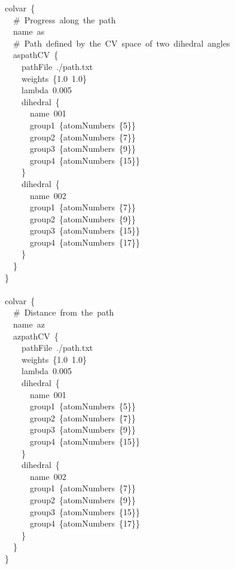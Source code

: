\begin{cvexampleinput}
colvar~\{\\
\-~~\#~Progress~along~the~path\\
\-~~name~as\\
\-~~\#~Path~defined~by~the~CV~space~of~two~dihedral~angles\\
\-~~aspathCV~\{\\
\-~~~~pathFile~./path.txt\\
\-~~~~weights~\{1.0~1.0\}\\
\-~~~~lambda~0.005\\
\-~~~~dihedral~\{\\
\-~~~~~~name~001\\
\-~~~~~~group1~\{atomNumbers~\{5\}\}\\
\-~~~~~~group2~\{atomNumbers~\{7\}\}\\
\-~~~~~~group3~\{atomNumbers~\{9\}\}\\
\-~~~~~~group4~\{atomNumbers~\{15\}\}\\
\-~~~~\}\\
\-~~~~dihedral~\{\\
\-~~~~~~name~002\\
\-~~~~~~group1~\{atomNumbers~\{7\}\}\\
\-~~~~~~group2~\{atomNumbers~\{9\}\}\\
\-~~~~~~group3~\{atomNumbers~\{15\}\}\\
\-~~~~~~group4~\{atomNumbers~\{17\}\}\\
\-~~~~\}\\
\-~~\}\\
\}\\
\\
colvar~\{\\
\-~~\#~Distance~from~the~path\\
\-~~name~az\\
\-~~azpathCV~\{\\
\-~~~~pathFile~./path.txt\\
\-~~~~weights~\{1.0~1.0\}\\
\-~~~~lambda~0.005\\
\-~~~~dihedral~\{\\
\-~~~~~~name~001\\
\-~~~~~~group1~\{atomNumbers~\{5\}\}\\
\-~~~~~~group2~\{atomNumbers~\{7\}\}\\
\-~~~~~~group3~\{atomNumbers~\{9\}\}\\
\-~~~~~~group4~\{atomNumbers~\{15\}\}\\
\-~~~~\}\\
\-~~~~dihedral~\{\\
\-~~~~~~name~002\\
\-~~~~~~group1~\{atomNumbers~\{7\}\}\\
\-~~~~~~group2~\{atomNumbers~\{9\}\}\\
\-~~~~~~group3~\{atomNumbers~\{15\}\}\\
\-~~~~~~group4~\{atomNumbers~\{17\}\}\\
\-~~~~\}\\
\-~~\}\\
\}
\end{cvexampleinput}


